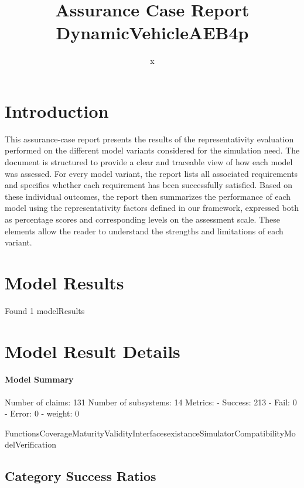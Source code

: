 \documentclass{article}
\title{Assurance Case Report DynamicVehicleAEB4p}
\author{x}
\begin{document}
	\maketitle
	\section{Introduction}
	This assurance-case report presents the results of the 
	representativity evaluation performed on the different model variants considered for 
	the simulation need. The document is structured to provide a clear and traceable view of how 
	each model was assessed. For every model variant, the report lists all associated requirements
	 and specifies whether each requirement has been successfully satisfied. Based on these 
	individual outcomes, the report then summarizes the performance of each model using the 
	representativity factors defined in our framework, expressed both as percentage scores 
	and corresponding levels on the assessment scale. These elements allow the reader to understand 
	the strengths and limitations of each variant.
	 
	\section{Model Results}
    Found 1 modelResults
		
			\section{Model Result Details} 
			\paragraph{Model Summary}
			Number of claims: 131
			Number of subsystems: 14
			Metrics:
			- Success: 213
			- Fail: 0
			- Error: 0
			- weight: 0
			
			FunctionsCoverageMaturityValidityInterfacesexistanceSimulatorCompatibilityModelVerification

					\subsection{Category Success Ratios}
						
\end{document}
